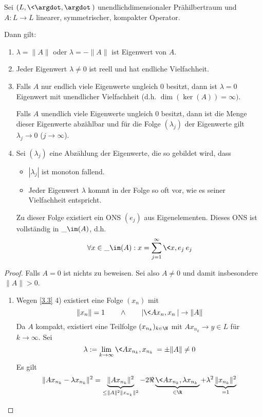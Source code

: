 \begin{st} \label{3.5}
	Sei $(L, \<\argdot,\argdot\>)$ unendlichdimensionaler Prähilbertraum und $A: L \to L$ linearer, symmetrischer, kompakter Operator.

	Dann gilt:
	\begin{enumerate}[1)]
		\item
			$\lambda = \|A \|$ oder $\lambda = - \|A\|$ ist Eigenwert von $A$.
		\item
			Jeder Eigenwert $\lambda \neq 0$ ist reell und hat endliche Vielfachheit.
		\item
			Falls $A$ nur endlich viele Eigenwerte ungleich $0$ besitzt, dann ist $\lambda = 0$ Eigenwert mit unendlicher Vielfachheit (d.h. $\dim (\ker (A)) = \infty)$.

			Falls $A$ unendlich viele Eigenwerte ungleich $0$ besitzt, dann ist die Menge dieser Eigenwerte abzählbar und für die Folge $(\lambda_j)$ der Eigenwerte gilt $\lambda_j \to 0$ ($j \to \infty$).
		\item
			Sei $(\lambda_j)$ eine Abzählung der Eigenwerte, die so gebildet wird, dass
			\begin{itemize}
				\item
					$|\lambda_j|$ ist monoton fallend.
				\item
					Jeder Eigenwert $\lambda$ kommt in der Folge so oft vor, wie es seiner Vielfachheit entspricht.
			\end{itemize}
			Zu dieser Folge existiert ein ONS $(e_j)$ aus Eigenelementen.
			Dieses ONS ist vollständig in $\_{\im (A)}$, d.h.
			\[
				\forall x \in \_{\im(A)} : x = \sum_{j=1}^\infty \<x,e_j\> e_j
			\]
	\end{enumerate}
	\begin{proof}
		Falls $A = 0$ ist nichts zu beweisen.
		Sei also $A \neq 0$ und damit insbesondere $\|A\| > 0$.
		\begin{enumerate}[1)]
			\item
				Wegen \ref{3.3} 4) existiert eine Folge $(x_n)$ mit
				\[
					\|x_n\| = 1 \qquad \land \qquad |\<Ax_n,x_n\>| \to \|A\|
				\]
				Da $A$ kompakt, existiert eine Teilfolge $(x_{n_k})_{k\in \N}$ mit $Ax_{n_k} \to y \in L$ für $k \to \infty$.
				Sei 
				\[
					\lambda := \lim_{k\to\infty} \<Ax_{n_k},x_{n_k}\> = \pm \|A\| \neq 0
				\]
				Es gilt
				\begin{align*}
					\|Ax_{n_k} - \lambda x_{n_k}\|^2
					&= \underbrace{\|Ax_{n_k} \|^2}_{\le \|A\|^2 \|x_{n_k}\|^2} - 2 \Re \underbrace{\< Ax_{n_k}, \lambda x_{n_k} \>}_{\in \R} + \lambda^2 \underbrace{\|x_{n_k}\|^2}_{=1} \\

\end{align*}
\end{enumerate}
\end{proof}
\end{st}
